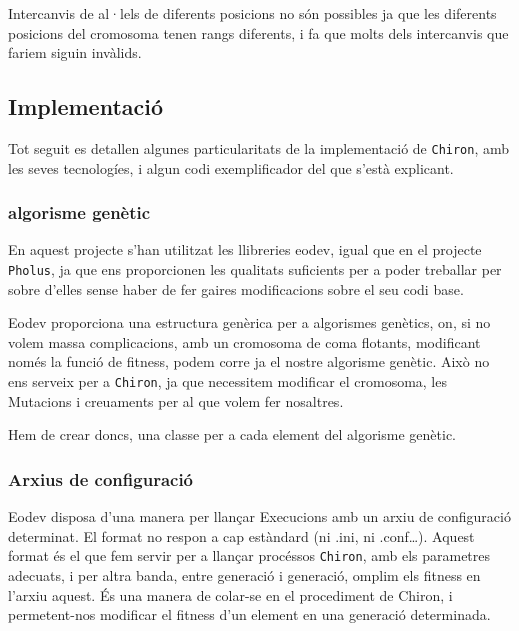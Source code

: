 \documentclass[titlepage,a4paper,12pt]{book}
\begin{document}
Intercanvis de al·lels de diferents posicions no són possibles ja que les
diferents posicions del cromosoma tenen rangs diferents, i fa que molts dels
intercanvis que fariem siguin invàlids.


\subsection{Implementació} %
	\label{sub:Implementacio}

Tot seguit es detallen algunes particularitats de la implementació de
\texttt{Chiron}, amb les seves tecnologíes, i algun codi exemplificador del que
s'està explicant.

\subsubsection{algorisme genètic} %
\label{ssub:algorisme genetic}

En aquest projecte s'han utilitzat les llibreries eodev, igual que en el
projecte \texttt{Pholus}, ja que ens proporcionen les qualitats suficients per a
poder treballar per sobre d'elles sense haber de fer gaires modificacions sobre
el seu codi base.

Eodev proporciona una estructura genèrica per a algorismes genètics, on, si no
volem massa complicacions, amb un cromosoma de coma flotants, modificant només
la funció de fitness, podem corre ja el nostre algorisme genètic.  Això no ens
serveix per a \texttt{Chiron}, ja que necessitem modificar el cromosoma, les
Mutacions i creuaments per al que volem fer nosaltres.

Hem de crear doncs, una classe per a cada element del algorisme genètic.



\subsubsection{Arxius de configuració} %
\label{ssub:Arxius de configuracio}

Eodev disposa d'una manera per llançar Execucions amb un arxiu de configuració
determinat.  El format no respon a cap estàndard (ni .ini, ni .conf\ldots).
Aquest format és el que fem servir per a llançar procéssos \texttt{Chiron}, amb
els parametres adecuats, i per altra banda, entre generació i generació, omplim
els fitness en l'arxiu aquest.  És una manera de colar-se en el procediment de
Chiron, i permetent-nos modificar el fitness d'un element en una generació
determinada.
\end{document}
